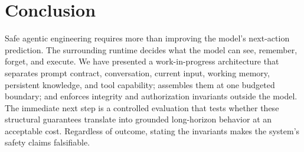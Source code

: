 \documentclass[sigplan,10pt,anonymous,review]{acmart}
\begin{document}
\section{Conclusion}

Safe agentic engineering requires more than improving the model's next-action
prediction.  The surrounding runtime decides what the model can see, remember,
forget, and execute.  We have presented a work-in-progress architecture that
separates prompt contract, conversation, current input, working memory,
persistent knowledge, and tool capability; assembles them at one budgeted
boundary; and enforces integrity and authorization invariants outside the
model.  The immediate next step is a controlled evaluation that tests whether
these structural guarantees translate into grounded long-horizon behavior at
an acceptable cost.  Regardless of outcome, stating the invariants makes the
system's safety claims falsifiable.



\end{document}
